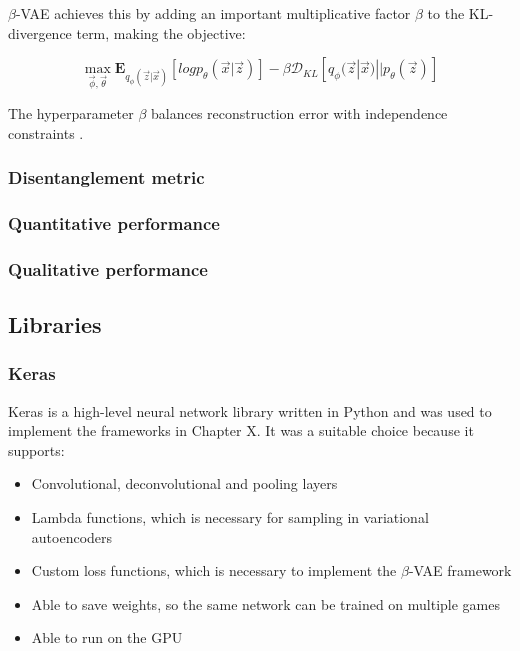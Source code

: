 \documentclass[12pt,twoside]{article}
\begin{document}
$\beta$-VAE achieves this by adding an important multiplicative factor $\beta$ to the KL-divergence term, making the objective:

\begin{equation}
\label{beta_vae_objective}
\max_{\vec{\phi},\vec{\theta}}\mathbf{E}_{q_{\phi}(\vec{z}|\vec{x})}[log p_{\theta}(\vec{x}|\vec{z})] - \beta\mathcal{D}_{KL}[q_{\phi}(\vec{z}|\vec{x})||p_{\theta}(\vec{z})]
\end{equation}

The hyperparameter $\beta$ balances reconstruction error with independence constraints \cite{Higgins2016}.

\subsubsection{Disentanglement metric}
\subsubsection{Quantitative performance}
\subsubsection{Qualitative performance}

\subsection{Libraries}
\subsubsection{Keras}

Keras is a high-level neural network library written in Python \cite{Chollet2015} and was used to implement the frameworks in Chapter X. It was a suitable choice because it supports:

\begin{itemize}
\item Convolutional, deconvolutional and pooling layers
\item Lambda functions, which is necessary for sampling in variational autoencoders
\item Custom loss functions, which is necessary to implement the $\beta$-VAE framework
\item Able to save weights, so the same network can be trained on multiple games
\item Able to run on the GPU
\end{itemize}
\end{document}
